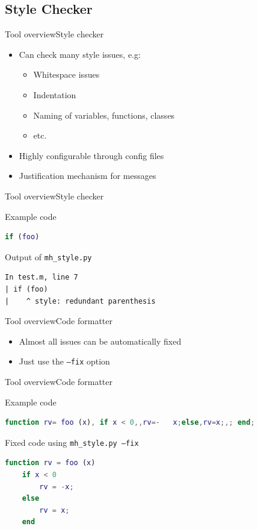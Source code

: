 \documentclass{beamer}
\begin{document}
\subsection{Style Checker}
\begin{frame}{Tool overview}{Style checker}
  \begin{itemize}
  \item Can check many style issues, e.g:
    \begin{itemize}
    \item Whitespace issues
    \item Indentation
    \item Naming of variables, functions, classes
    \item etc.
    \end{itemize}
  \item Highly configurable through config files
  \item Justification mechanism for messages
  \end{itemize}
\end{frame}

\begin{frame}[fragile]{Tool overview}{Style checker}
  \begin{block}{Example code}
\begin{lstlisting}[language=MATLAB]
if (foo)
\end{lstlisting}
  \end{block}
  \pause
  \begin{block}{Output of {\tt mh\_style.py}}
    \scriptsize
\begin{verbatim}
In test.m, line 7
| if (foo)
|    ^ style: redundant parenthesis
\end{verbatim}
  \end{block}
\end{frame}

\begin{frame}{Tool overview}{Code formatter}
  \begin{itemize}
  \item Almost all issues can be automatically fixed
  \item Just use the {\tt --fix} option
  \end{itemize}
\end{frame}

\begin{frame}[fragile]{Tool overview}{Code formatter}
  \begin{block}{Example code}
\begin{lstlisting}[language=MATLAB]
function rv= foo (x), if x < 0,,rv=-   x;else,rv=x;,; end;
\end{lstlisting}
  \end{block}
  \pause
  \begin{block}{Fixed code using {\tt mh\_style.py --fix}}
\begin{lstlisting}[language=MATLAB]
function rv = foo (x)
    if x < 0
        rv = -x;
    else
        rv = x;
    end
\end{lstlisting}
  \end{block}
\end{frame}
\end{document}
